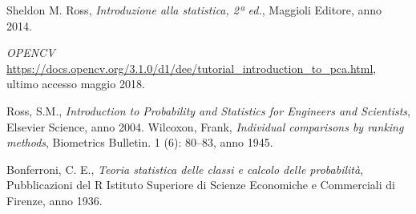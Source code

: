 \documentclass[12pt]{report}
\begin{document}
\begin{thebibliography}{00}
 Sheldon M. Ross, \emph{Introduzione alla statistica, 2ª ed.}, Maggioli Editore, anno 2014.

\emph{OPENCV} \url{https://docs.opencv.org/3.1.0/d1/dee/tutorial_introduction_to_pca.html}, ultimo accesso maggio 2018.

 Ross, S.M., \emph{Introduction to Probability and Statistics for Engineers and Scientists}, Elsevier Science, anno 2004.
  Wilcoxon, Frank,\emph{ Individual comparisons by ranking methods}, Biometrics Bulletin. 1 (6): 80–83, anno 1945.

Bonferroni, C. E., \emph{Teoria statistica delle classi e calcolo delle probabilità}, Pubblicazioni del R Istituto Superiore di Scienze Economiche e Commerciali di Firenze, anno 1936.
%
\end{thebibliography}
% 
\end{document}
